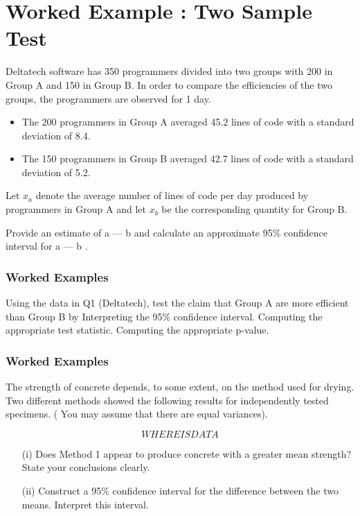 \section{Worked Example : Two Sample Test} Deltatech software has 350 programmers divided into two groups with 200 in Group A and 150 in Group B. In order to compare the efficiencies of the two groups, the programmers are observed for  1 day.

\begin{itemize}
\item  The 200 programmers in Group A averaged 45.2 lines of code with a standard deviation of 8.4.

\item The 150 programmers in Group B averaged 42.7 lines of code with a standard deviation of 5.2.

\end{itemize}


Let $x_a$ denote the average number of lines of code per day produced by programmers in Group A and
let $x_b$ be the corresponding quantity for Group B.

Provide an estimate of a — b and calculate an approximate 95\% confidence interval for a — b .


\subsubsection{Worked Examples} 
 Using the data in Q1 (Deltatech), test the claim that Group A are more efficient than Group B by
Interpreting the 95\% confidence interval.
Computing the appropriate test statistic.
Computing the appropriate p-value.



\subsubsection{Worked Examples} 

The strength of concrete depends, to some extent, on the method used for drying. Two different methods showed the following results for independently tested specimens.  ( You may assume that there are equal variances).

\[ WHERE IS DATA \]


\begin{itemize}
\item[(i)] Does Method 1 appear to produce concrete with a greater mean strength? State your conclusions clearly.
\item[(ii)]Construct a 95\% confidence interval for the difference between the two means. Interpret this interval.

\end{itemize}






